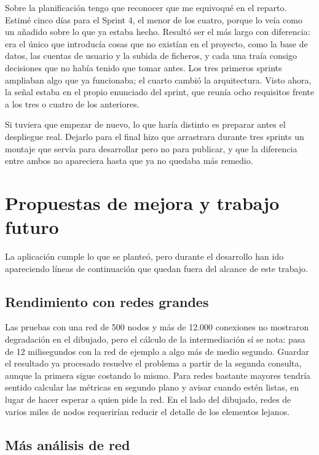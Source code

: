 Sobre la planificación tengo que reconocer que me equivoqué en el reparto. Estimé cinco días para el
Sprint 4, el menor de los cuatro, porque lo veía como un añadido sobre lo que ya estaba hecho.
Resultó ser el más largo con diferencia: era el único que introducía cosas que no existían en el
proyecto, como la base de datos, las cuentas de usuario y la subida de ficheros, y cada una traía
consigo decisiones que no había tenido que tomar antes. Los tres primeros sprints ampliaban algo que
ya funcionaba; el cuarto cambió la arquitectura. Visto ahora, la señal estaba en el propio enunciado
del sprint, que reunía ocho requisitos frente a los tres o cuatro de los anteriores.

Si tuviera que empezar de nuevo, lo que haría distinto es preparar antes el despliegue real. Dejarlo
para el final hizo que arrastrara durante tres sprints un montaje que servía para desarrollar pero no
para publicar, y que la diferencia entre ambos no apareciera hasta que ya no quedaba más remedio.

\section{Propuestas de mejora y trabajo futuro}

La aplicación cumple lo que se planteó, pero durante el desarrollo han ido apareciendo líneas de
continuación que quedan fuera del alcance de este trabajo.

\subsection*{Rendimiento con redes grandes}

Las pruebas con una red de 500 nodos y más de 12.000 conexiones no mostraron degradación en el
dibujado, pero el cálculo de la intermediación sí se nota: pasa de 12 milisegundos con la red de
ejemplo a algo más de medio segundo. Guardar el resultado ya procesado resuelve el problema a partir
de la segunda consulta, aunque la primera sigue costando lo mismo. Para redes bastante mayores tendría
sentido calcular las métricas en segundo plano y avisar cuando estén listas, en lugar de hacer
esperar a quien pide la red. En el lado del dibujado, redes de varios miles de nodos requerirían
reducir el detalle de los elementos lejanos.

\subsection*{Más análisis de red}

